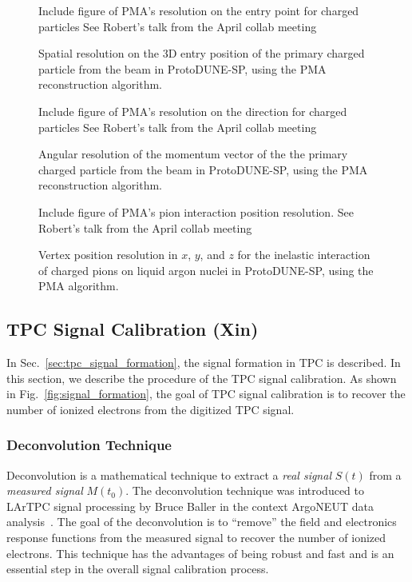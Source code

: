 \begin{figure}[htb]
\centering
Include figure of PMA's resolution on the entry point for charged
particles See Robert's talk from the April collab meeting
\caption{Spatial resolution on the 3D entry position of the primary
  charged particle from the beam in ProtoDUNE-SP, using the PMA
  reconstruction algorithm.}
\label{fig:PMAentryresolution}
\end{figure}

\begin{figure}[htb]
\centering
Include figure of PMA's resolution on the direction for charged
particles See Robert's talk from the April collab meeting
\caption{Angular resolution of the momentum vector of the the primary
  charged particle from the beam in ProtoDUNE-SP, using the PMA
  reconstruction algorithm.}
\label{fig:PMAdirection}
\end{figure}

\begin{figure}[htb]
\centering
Include figure of PMA's pion interaction position resolution.  See
Robert's talk from the April collab meeting
\caption{Vertex position resolution in $x$, $y$, and $z$ for the
  inelastic interaction of charged pions on liquid argon nuclei in
  ProtoDUNE-SP, using the PMA algorithm.}
\label{fig:PMApioninteraction}
\end{figure}


\subsection{TPC Signal Calibration (Xin)}

In Sec.~\ref{sec:tpc_signal_formation}, the signal formation in TPC
is described. In this section, we describe the procedure of the TPC signal
calibration. As shown in Fig.~\ref{fig:signal_formation}, the goal of TPC 
signal calibration is to recover the number of ionized electrons from the 
digitized TPC signal. 

\subsubsection{Deconvolution Technique}\label{sec:decon}
Deconvolution is a mathematical technique to extract a \textit{real signal}
$S(t)$ from a \textit{measured signal} $M(t_0)$. 
The deconvolution technique was introduced to LArTPC signal processing by 
Bruce Baller in the context ArgoNEUT data analysis~\cite{bruce}. The goal of the 
deconvolution is to ``remove'' the field and electronics response functions 
from the measured signal to recover the number of ionized electrons. This 
technique has the advantages of being robust and fast and is an essential 
step in the overall signal calibration process. 


